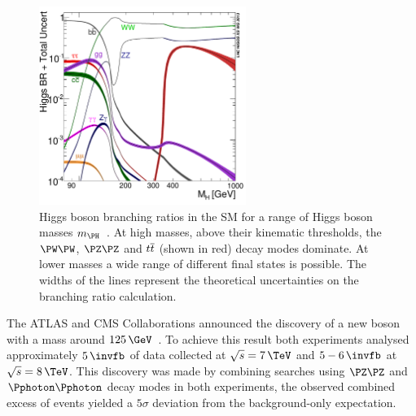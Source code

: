 \begin{figure}[!htb]
 \includegraphics[width=0.6\textwidth]{Chapter01/Images/Higgs_BR.pdf}
\caption[Higgs boson branching ratios in the SM for a range of Higgs boson masses.]
{Higgs boson branching ratios in the SM for a range of Higgs boson masses $m_{\PH}$~\cite{ARTICLE:HandbookofLHCHiggsCrossSectionsHiggsProperties}. At high masses, above their kinematic thresholds, the $\PW\PW$, $\PZ\PZ$ and $t\overline{t}$ (shown in red) decay modes dominate. At lower masses a wide range of different final states is possible. The widths of the lines represent the theoretical uncertainties on the branching ratio calculation.}
\label{FIGURE:Theory_SM_SearchingSMHiggs_SMHiggsBRs}
\end{figure}

The ATLAS and CMS Collaborations announced the discovery of a new boson with a mass around $125\,\GeV$~\cite{ARTICLE:CMS_HiggsDiscovery,ARTICLE:ATLAS_HiggsDiscovery}. To achieve this result both experiments analysed approximately $5\,\invfb$ of data collected at $\sqrt{s}=7\,\TeV$ and $5-6\,\invfb$ at $\sqrt{s}=8\,\TeV$. This discovery was made by combining searches using $\PZ\PZ$ and $\Pphoton\Pphoton$ decay modes in both experiments, the observed combined excess of events yielded a $5\sigma$ deviation from the background-only expectation.

